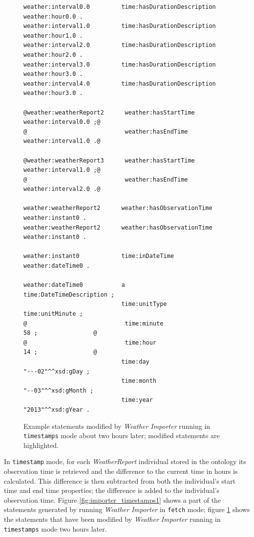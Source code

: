 \begin{figure}
\begin{lstlisting}[escapechar=!]
weather:interval0.0         time:hasDurationDescription           weather:hour0.0 .
weather:interval1.0         time:hasDurationDescription           weather:hour1.0 .
weather:interval2.0         time:hasDurationDescription           weather:hour2.0 .
weather:interval3.0         time:hasDurationDescription           weather:hour3.0 .
weather:interval4.0         time:hasDurationDescription           weather:hour3.0 .

@weather:weatherReport2      weather:hasStartTime                  weather:interval0.0 ;@
@                            weather:hasEndTime                    weather:interval1.0 .@

@weather:weatherReport3      weather:hasStartTime                  weather:interval1.0 ;@
@                            weather:hasEndTime                    weather:interval2.0 .@

weather:weatherReport2      weather:hasObservationTime            weather:instant0 .
weather:weatherReport2      weather:hasObservationTime            weather:instant0 .

weather:instant0            time:inDateTime                       weather:dateTime0 .

weather:dateTime0           a                                     time:DateTimeDescription ;
                            time:unitType                         time:unitMinute ;
@                            time:minute                           58 ;                @
@                            time:hour                             14 ;                @
                            time:day                              "---02"^^xsd:gDay ;
                            time:month                            "--03"^^xsd:gMonth ;
                            time:year                             "2013"^^xsd:gYear .
\end{lstlisting}
\caption{Example statements modified by \emph{Weather Importer} running in \texttt{timestamps} mode about two hours later; modified statements are highlighted.}
\label{fig:importer_timestamps2}
\end{figure}

In \texttt{timestamp} mode, for each \emph{WeatherReport} individual stored in the ontology its observation time is retrieved and the difference to the current time in hours is calculated. This difference is then subtracted from both the individual's start time and end time properties; the difference is added to the individual's observation time. Figure \ref{fig:importer_timestamps1} shows a part of the statements generated by running \emph{Weather Importer} in \texttt{fetch} mode; figure \ref{fig:importer_timestamps2} shows the statements that have been modified by \emph{Weather Importer} running in \texttt{timestamps} mode two hours later.

